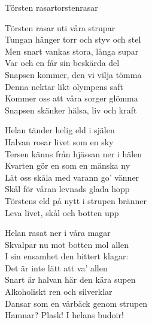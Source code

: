\begin{song}{Törsten rasar}{torstenrasar}
\begin{vers}
Törsten rasar uti våra strupar\\
Tungan hänger torr och styv och stel\\
Men snart vankas stora, långa supar\\
Var och en får sin beskärda del\\
Snapsen kommer, den vi vilja tömma\\
Denna nektar likt olympens saft\\
Kommer oss att våra sorger glömma\\
Snapsen skänker hälsa, liv och kraft\\
\end{vers}

\begin{vers}
Helan tänder helig eld i själen\\
Halvan rosar livet som en sky\\
Tersen känns från hjässan ner i hälen\\
Kvarten gör en som en mänska ny\\
Låt oss skåla med varann go' vänner\\
Skål för våran levnads glada hopp\\
Törstens eld på nytt i strupen bränner\\
Leva livet, skål och botten upp\\
\end{vers}

\begin{vers}
Helan rasat ner i våra magar\\
Skvalpar nu mot botten mol allen\\
I sin ensamhet den bittert klagar:\\
Det är inte lätt att va' allen\\
Snart är halvan här den kära supen\\
Alkoholiskt ren och silverklar\\
Dansar som en vårbäck genom strupen\\
Hamnar? Plask! I helans budoir!\\
\end{vers}
\end{song}
